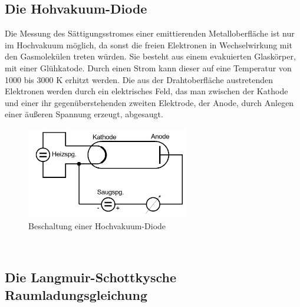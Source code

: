 \subsection{Die Hohvakuum-Diode}
Die Messung des Sättigungsstromes einer emittierenden Metalloberfläche ist nur im Hochvakuum möglich, da sonst die freien Elektronen in Wechselwirkung mit den Gasmolekülen treten würden.
Sie besteht aus einem evakuierten Glaskörper, mit einer Glühkatode.
Durch einen Strom kann dieser auf eine Temperatur von 1000 bis 3000 K erhitzt werden.
Die aus der Drahtoberfläche austretenden Elektronen werden durch ein elektrisches Feld, das man zwischen der Kathode und einer ihr gegenüberstehenden zweiten Elektrode, der Anode, durch Anlegen einer äußeren Spannung erzeugt, abgesaugt.
\begin{figure}
    \centering
    \includegraphics[height=4.0cm]{data/abb3.jpg}
    \caption{Beschaltung einer Hochvakuum-Diode \cite{V504}}
    \label{fig:abb3}
\end{figure} \\
\noindent

\subsection{Die Langmuir-Schottkysche Raumladungsgleichung}